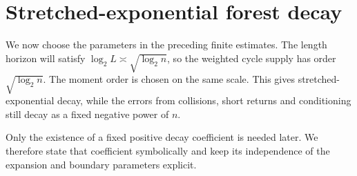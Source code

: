 \documentclass[11pt,a4paper]{article}
\numberwithin{equation}{section}
\theoremstyle{definition}
\theoremstyle{remark}
\begin{document}
\section{Stretched-exponential forest decay}\label{sec:forest-decay}
We now choose the parameters in the preceding finite estimates. The length horizon will satisfy $\log_2 L\asymp\sqrt{\log_2 n}$, so the weighted cycle supply has order $\sqrt{\log_2 n}$. The moment order is chosen on the same scale. This gives stretched-exponential decay, while the errors from collisions, short returns and conditioning still decay as a fixed negative power of $n$.

Only the existence of a fixed positive decay coefficient is needed later. We therefore state that coefficient symbolically and keep its independence of the expansion and boundary parameters explicit.
\end{document}
